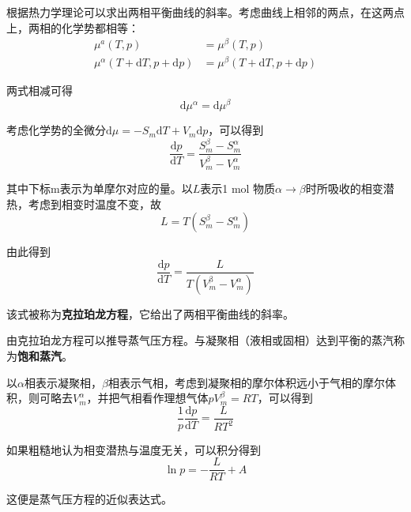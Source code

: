 \documentclass[UTF8]{ctexart}
\begin{document}
	根据热力学理论可以求出两相平衡曲线的斜率。考虑曲线上相邻的两点，在这两点上，两相的化学势都相等：
	\begin{equation}
	\begin{aligned} \mu^{a}(T, p) &=\mu^{\beta}(T, p) \\ \mu^{\alpha}(T+\mathrm{d} T, p+\mathrm{d} p) &=\mu^{\beta}(T+\mathrm{d} T, p+\mathrm{d} p) \end{aligned}
	\end{equation}
	
\noindent 两式相减可得
\begin{equation}
\mathrm{d} \mu^{\alpha}=\mathrm{d} \mu^{\beta}
\end{equation}

\noindent 考虑化学势的全微分$\mathrm{d} \mu=-S_{m} \mathrm{d} T+V_{m} \mathrm{d} p$，可以得到
\begin{equation}
\frac{\mathrm{d} p}{\mathrm{d} T}=\frac{S_{m}^{\beta}-S_{m}^{\alpha}}{V_{m}^{\beta}-V_{m}^{\alpha}}
\end{equation}

\noindent 其中下标m表示为单摩尔对应的量。以$ L $表示1 mol 物质$ \alpha \rightarrow \beta $时所吸收的相变潜热，考虑到相变时温度不变，故
\begin{equation}
L=T\left(S_{m}^{\beta}-S_{m}^{\alpha}\right)
\end{equation}

\noindent 由此得到
\begin{equation}
\frac{\mathrm{d} p}{\mathrm{d} T}=\frac{L}{T\left(V_{m}^{\mathrm{\beta}}-V_{m}^{\alpha}\right)}
\end{equation}

\noindent 该式被称为\textbf{克拉珀龙方程}，它给出了两相平衡曲线的斜率。

	由克拉珀龙方程可以推导蒸气压方程。与凝聚相（液相或固相）达到平衡的蒸汽称为\textbf{饱和蒸汽}。
	
	以$ \alpha $相表示凝聚相，$ \beta $相表示气相，考虑到凝聚相的摩尔体积远小于气相的摩尔体积，则可略去$ V_{m}^{\alpha} $，并把气相看作理想气体$p V_{m}^{\beta}=R T$，可以得到
	\begin{equation}
	\frac{1}{p} \frac{\mathrm{d} p}{\mathrm{d} T}=\frac{L}{R T^{2}}
	\end{equation}
	
\noindent 如果粗糙地认为相变潜热与温度无关，可以积分得到
\begin{equation}
\ln p=-\frac{L}{R T}+A
\end{equation}

\noindent 这便是蒸气压方程的近似表达式。
\end{document}
